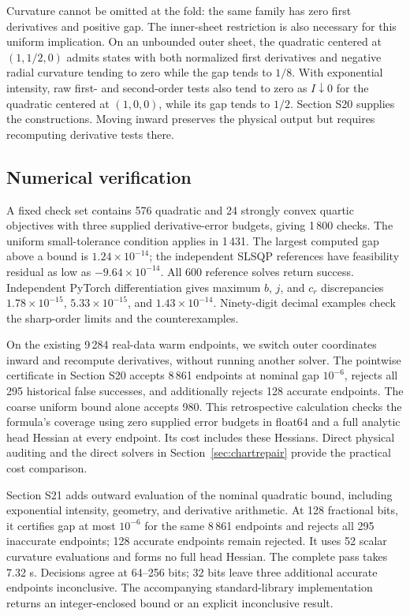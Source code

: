 Curvature cannot be omitted at the fold: the same family has zero first derivatives and positive gap. The inner-sheet restriction is also necessary for this uniform implication. On an unbounded outer sheet, the quadratic centered at $(1,1/2,0)$ admits states with both normalized first derivatives and negative radial curvature tending to zero while the gap tends to $1/8$. With exponential intensity, raw first- and second-order tests also tend to zero as $I\downarrow0$ for the quadratic centered at $(1,0,0)$, while its gap tends to $1/2$. Section S20 supplies the constructions. Moving inward preserves the physical output but requires recomputing derivative tests there.

\subsection{Numerical verification}
A fixed check set contains 576 quadratic and 24 strongly convex quartic objectives with three supplied derivative-error budgets, giving 1\,800 checks. The uniform small-tolerance condition applies in 1\,431. The largest computed gap above a bound is $1.24\times10^{-14}$; the independent SLSQP references have feasibility residual as low as $-9.64\times10^{-14}$. All 600 reference solves return success. Independent PyTorch differentiation gives maximum $b$, $j$, and $c_r$ discrepancies $1.78\times10^{-15}$, $5.33\times10^{-15}$, and $1.43\times10^{-14}$. Ninety-digit decimal examples check the sharp-order limits and the counterexamples.

On the existing 9\,284 real-data warm endpoints, we switch outer coordinates inward and recompute derivatives, without running another solver. The pointwise certificate in Section S20 accepts 8\,861 endpoints at nominal gap $10^{-6}$, rejects all 295 historical false successes, and additionally rejects 128 accurate endpoints. The coarse uniform bound alone accepts 980. This retrospective calculation checks the formula's coverage using zero supplied error budgets in float64 and a full analytic head Hessian at every endpoint. Its cost includes these Hessians. Direct physical auditing and the direct solvers in Section~\ref{sec:chartrepair} provide the practical cost comparison.

Section S21 adds outward evaluation of the nominal quadratic bound, including exponential intensity, geometry, and derivative arithmetic. At 128 fractional bits, it certifies gap at most $10^{-6}$ for the same 8\,861 endpoints and rejects all 295 inaccurate endpoints; 128 accurate endpoints remain rejected. It uses 52 scalar curvature evaluations and forms no full head Hessian. The complete pass takes 7.32 s. Decisions agree at 64--256 bits; 32 bits leave three additional accurate endpoints inconclusive. The accompanying standard-library implementation returns an integer-enclosed bound or an explicit inconclusive result.

